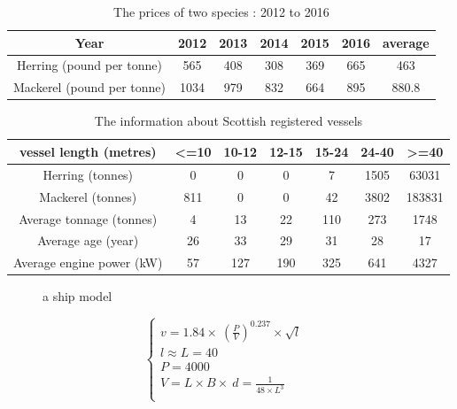 \documentclass{mcmthesis}
\begin{document}
\begin{table}[!htb]
\centering
\setlength{\abovecaptionskip}{0pt}%
\setlength{\belowcaptionskip}{13pt}%
\caption{The prices of two species : 2012 to 2016}
\begin{tabular}{ccccccc}
\toprule[1.5pt]
Year&2012&2013&2014&2015&2016&average\\
\bottomrule[1.5pt]
Herring (pound  per tonne)  &565&408&308&369&665&463\\
Mackerel (pound  per tonne)  &1034&979&832&664&895&880.8\\
\bottomrule[1.5pt]
\end{tabular}
\end{table}


\begin{table}[!htb]
\centering
\setlength{\abovecaptionskip}{0pt}%
\setlength{\belowcaptionskip}{13pt}%
\caption{The information about Scottish registered vessels}
\begin{tabular}{ccccccc}
\toprule[1.5pt]
vessel length (metres)&<=10&10-12&12-15&15-24&24-40&>=40\\
\bottomrule[1.5pt]
Herring (tonnes)&0&0&0&7&1505&63031\\
Mackerel (tonnes) &811&0&0&42&3802&183831\\
Average tonnage (tonnes)&4&13&22&110&273&1748\\
Average age (year)&26&33&29&31&28&17\\
Average engine power (kW)&57&127&190&325&641&4327\\

\bottomrule[1.5pt]
\end{tabular}
\end{table}

\begin{figure}[tbp]
  \caption{a ship model}\label{figure1}
\end{figure}

\begin{equation}
\left\{
\begin{array}{lr}
v=1.84\times \ (\frac{P}{V}) ^{0.237} \times \sqrt{l} &\\
l \approx L= 40 &\\
P=4000&\\
V=L\times B\times\ d =\frac{1}{48\times L^3}\\
\end{array}
\right.
\end{equation}
\end{document}
